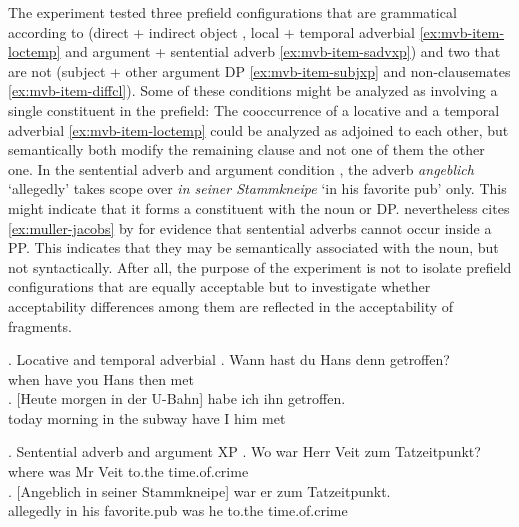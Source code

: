 The experiment tested three prefield configurations that are grammatical according to \citet{muller2005} (direct + indirect object \Last, local + temporal adverbial \ref{ex:mvb-item-loctemp} and argument + sentential adverb \ref{ex:mvb-item-sadvxp}) and two that are not (subject + other argument DP \ref{ex:mvb-item-subjxp} and non-clausemates \ref{ex:mvb-item-diffcl}). Some of these conditions might be analyzed as involving a single constituent in the prefield: The cooccurrence of a locative and a temporal adverbial \ref{ex:mvb-item-loctemp} could be analyzed as adjoined to each other, but semantically both modify the remaining clause and not one of them the other one. In the sentential adverb and argument condition \NNext, the adverb \textit{angeblich} `allegedly' takes scope over \textit{in seiner Stammkneipe} `in his favorite pub' only. This might indicate that it forms a constituent with the noun or DP. \citet[31]{muller2003} nevertheless cites \ref{ex:muller-jacobs} by \citet[112]{jacobs1986} for evidence that sentential adverbs cannot occur inside a PP. This indicates that they may be semantically associated with the noun, but not syntactically. After all, the purpose of the experiment is not to isolate prefield configurations that are equally acceptable but to investigate whether acceptability differences among them are reflected in the acceptability of fragments.

\ex. Locative and temporal adverbial\label{ex:mvb-item-loctemp}
\ag. Wann hast  du   Hans denn getroffen? \\
when have you Hans  then  met\\
\bg. [Heute morgen  in der U-Bahn] habe ich ihn getroffen.\\
today   morning in the subway  have I    him met\\

\ex. Sentential adverb and argument XP\label{ex:mvb-item-sadvxp}
\ag. Wo  war Herr Veit zum   Tatzeitpunkt?\\
    where  was Mr    Veit to.the time.of.crime\\
\bg. [Angeblich in seiner  Stammkneipe] war er  zum  Tatzeitpunkt.\\
allegedly in his favorite.pub was he to.the time.of.crime\\

